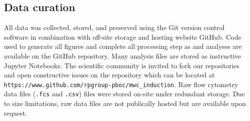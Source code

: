 \subsection*{Data curation}
All data was collected, stored, and preserved using the Git version control
software in combination with off-site storage and hosting website GitHub. Code
used to generate all figures and complete all processing step as and analyses
are available on the GitHub repository. Many analysis files are stored as
instructive Jupyter Notebooks. The scientific community is invited to fork our
repositories and open constructive issues on the repository which can be
located at \texttt{https://www.github.com/rpgroup-pboc/mwc\_induction}. Raw
flow cytometry data files (\texttt{.fcs} and \texttt{.csv}) files were stored
on-site under redundant storage. Due to size limitations, raw data files are
not publically hosted but are available upon request.


